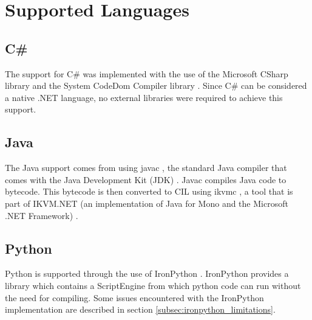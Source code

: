 \section{Supported Languages}

\subsection{C\#}
The support for C\# was implemented with the use of the Microsoft CSharp library \cite{MicrosoftCSharp} and the System CodeDom Compiler library \cite{CodeDomCompiler}. Since C\# can be considered a native .NET language, no external libraries were required to achieve this support.

\subsection{Java}
The Java support comes from using javac \cite{Javac}, the standard Java compiler that comes with the Java Development Kit (JDK) \cite{JDK}. Javac compiles Java code to bytecode. This bytecode is then converted to CIL using ikvmc \cite{IKVMC}, a tool that is part of IKVM.NET (an implementation of Java for Mono and the Microsoft .NET Framework) \cite{IKVM.NET}. 

\subsection{Python}
Python is supported through the use of IronPython \cite{IronPython}. IronPython provides a library which contains a ScriptEngine from which python code can run without the need for compiling. Some issues encountered with the IronPython implementation are described in section \ref{subsec:ironpython_limitations}.
